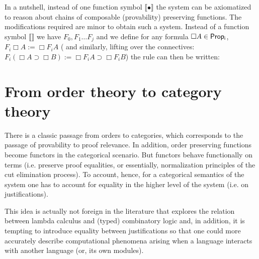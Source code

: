 In a nutshell, instead 
of one function symbol $\llbracket\bullet \rrbracket$ 
the system can 
be axiomatized to reason about chains of 
composable (provability) preserving functions. 
The modifications required are minor to obtain such a system.
Instead of a function symbol $\llbracket \rrbracket$ we have $F_0, F_1\ldots F_j$ and we 
define for any formula $\Box A\in {\sf Prop_i}$, 
$F_i\Box A:= \Box F_i A$ (
    and similarly, lifting over the connectives: 
$F_i(\Box A\supset \Box B):= \Box F_i A\supset\Box F_i B$)
the rule can then be written:





\section{From order theory to category theory}

There is a classic passage from orders to categories, 
which corresponds to the passage of provability to 
proof relevance. In addition, order preserving functions become 
functors in the categorical scenario. But functors behave functionally
on terms (i.e. preserve proof equalities, or essentially, normalization principles of the cut elimination process).
To account, hence, for 
a categorical semantics of the system one has to account for equality
in the higher level of the system (i.e. on justifications).

This idea is actually not foreign in the literature that explores the relation
between lambda calculus and (typed) combinatory logic and, in addition,
it is tempting to introduce equality between justifications so that one
could more accurately describe computational phenomena arising when 
a language interacts with another language (or, its own modules).

